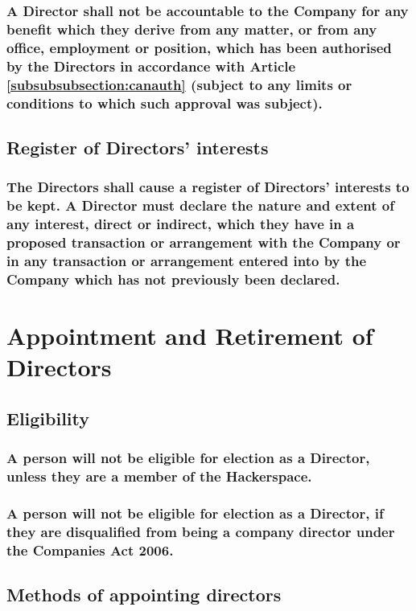 \documentclass[12pt]{article}
\begin{document}
\subsubsection{A Director shall not be accountable to the Company for any benefit which they derive from any matter, or from any office, employment or position, which has been authorised by the Directors in accordance with Article \ref{subsubsubsection:canauth} (subject to any limits or conditions to which such approval was subject).}

\subsection{Register of Directors' interests}
\subsubsection{The Directors shall cause a register of Directors' interests to be kept. A Director must declare the nature and extent of any interest, direct or indirect, which they have in a proposed transaction or arrangement with the Company or in any transaction or arrangement entered into by the Company which has not previously been declared.}

\section*{Appointment and Retirement of Directors}

\subsection{Eligibility}
\subsubsection{A person will not be eligible for election as a Director, unless they are a member of the Hackerspace.}
\subsubsection{\label{subsection:caDisqualified}A person will not be eligible for election as a Director, if they are disqualified from being a company director under the Companies Act 2006.}

\subsection{Methods of appointing directors}
\end{document}
